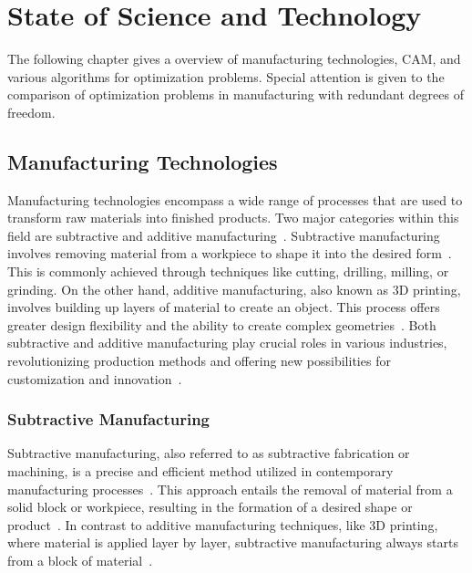 \chapter{State of Science and Technology}%
The following chapter gives a overview of manufacturing technologies, CAM, and various algorithms for optimization problems. Special attention is given to the comparison of optimization problems in manufacturing with redundant degrees of freedom. 
\section{Manufacturing Technologies}
Manufacturing technologies encompass a wide range of processes that are used to transform raw materials into finished products. Two major categories within this field are subtractive and additive manufacturing~\cite{Iqbal.2020}. Subtractive manufacturing involves removing material from a workpiece to shape it into the desired form~\cite{Watson.2015}. This is commonly achieved through techniques like cutting, drilling, milling, or grinding. On the other hand, additive manufacturing, also known as 3D printing, involves building up layers of material to create an object. This process offers greater design flexibility and the ability to create complex geometries~\cite{Dilberoglu.2017}. Both subtractive and additive manufacturing play crucial roles in various industries, revolutionizing production methods and offering new possibilities for customization and innovation~\cite{Bandyopadhyay.2020, vanLe.2017}.











\subsection{Subtractive Manufacturing}
Subtractive manufacturing, also referred to as subtractive fabrication or machining, is a precise and efficient method utilized in contemporary manufacturing processes~\cite{Wang.2023}. This approach entails the removal of material from a solid block or workpiece, resulting in the formation of a desired shape or product~\cite{Calleja.2018}. In contrast to additive manufacturing techniques, like 3D printing, where material is applied layer by layer, subtractive manufacturing always starts from a block of material~\cite{Abdulhameed.2019}.

